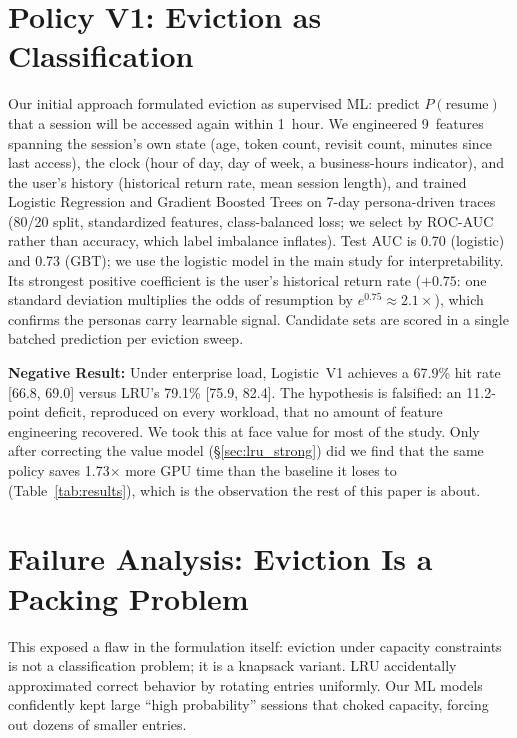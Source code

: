 \documentclass[letterpaper,twocolumn,10pt]{article}
\begin{document}
\section{Policy V1: Eviction as Classification}
\label{sec:v1}

Our initial approach formulated eviction as supervised ML: predict $P(\text{resume})$ that a session will be accessed again within 1~hour. We engineered 9~features spanning the session's own state (age, token count, revisit count, minutes since last access), the clock (hour of day, day of week, a business-hours indicator), and the user's history (historical return rate, mean session length), and trained Logistic Regression and Gradient Boosted Trees on 7-day persona-driven traces (80/20 split, standardized features, class-balanced loss; we select by ROC-AUC rather than accuracy, which label imbalance inflates). Test AUC is 0.70 (logistic) and 0.73 (GBT); we use the logistic model in the main study for interpretability. Its strongest positive coefficient is the user's historical return rate ($+0.75$: one standard deviation multiplies the odds of resumption by $e^{0.75}{\approx}2.1\times$), which confirms the personas carry learnable signal. Candidate sets are scored in a single batched prediction per eviction sweep.

\textbf{Negative Result:} Under enterprise load, Logistic~V1 achieves a 67.9\% hit rate [66.8, 69.0] versus LRU's 79.1\% [75.9, 82.4]. The hypothesis is falsified: an 11.2-point deficit, reproduced on every workload, that no amount of feature engineering recovered. We took this at face value for most of the study. Only after correcting the value model (\S\ref{sec:lru_strong}) did we find that the same policy saves 1.73$\times$ more GPU time than the baseline it loses to (Table~\ref{tab:results}), which is the observation the rest of this paper is about.

\section{Failure Analysis: Eviction Is a Packing Problem}
\label{sec:failure}

This exposed a flaw in the formulation itself: eviction under capacity constraints is not a classification problem; it is a knapsack variant. LRU accidentally approximated correct behavior by rotating entries uniformly. Our ML models confidently kept large ``high probability'' sessions that choked capacity, forcing out dozens of smaller entries.
\end{document}
